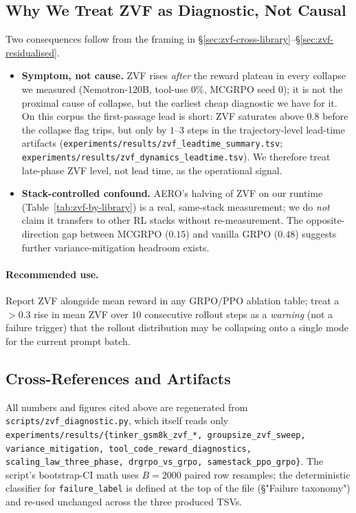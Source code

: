 \documentclass{article}
\begin{document}
\subsection{Why We Treat ZVF as Diagnostic, Not Causal}
\label{sec:zvf-caveat}
Two consequences follow from the framing in
\S\ref{sec:zvf-cross-library}--\S\ref{sec:zvf-residualised}.
\begin{itemize}
\item \textbf{Symptom, not cause.} ZVF rises \emph{after} the reward
plateau in every collapse we measured (Nemotron-120B, tool-use
$0\%$, MCGRPO seed 0); it is not the proximal cause of collapse, but
the earliest cheap diagnostic we have for it. On this corpus the first-passage
lead is short: ZVF saturates above $0.8$ before the collapse flag trips, but
only by $1$--$3$ steps in the trajectory-level lead-time artifacts
(\texttt{experiments/results/zvf\_leadtime\_summary.tsv};
\texttt{experiments/results/zvf\_dynamics\_leadtime.tsv}). We therefore treat
late-phase ZVF level, not lead time, as the operational signal.
\item \textbf{Stack-controlled confound.} AERO's halving of ZVF on our
runtime (Table~\ref{tab:zvf-by-library}) is a real, same-stack
measurement; we do \emph{not} claim it transfers to other RL
stacks without re-measurement. The opposite-direction gap between
MCGRPO ($0.15$) and vanilla GRPO ($0.48$) suggests further
variance-mitigation headroom exists.
\end{itemize}

\paragraph{Recommended use.} Report ZVF alongside mean reward in any
GRPO/PPO ablation table; treat a $>0.3$ rise in mean ZVF over
$10$ consecutive rollout steps as a \emph{warning} (not a failure
trigger) that the rollout distribution may be collapsing onto a
single mode for the current prompt batch.

\subsection{Cross-References and Artifacts}
\label{sec:zvf-artifacts}
All numbers and figures cited above are regenerated from
\texttt{scripts/zvf_diagnostic.py}, which itself reads only
\texttt{experiments/results/\{tinker_gsm8k_zvf_*, groupsize_zvf_sweep,
variance_mitigation, tool_code_reward_diagnostics,
scaling_law_three_phase, drgrpo_vs_grpo, samestack_ppo_grpo\}}. The
script's bootstrap-CI math uses $B{=}2000$ paired row resamples; the
deterministic classifier for \texttt{failure_label} is defined at the top
of the file (\S"Failure taxonomy") and re-used unchanged across the
three produced TSVs.
\end{document}
